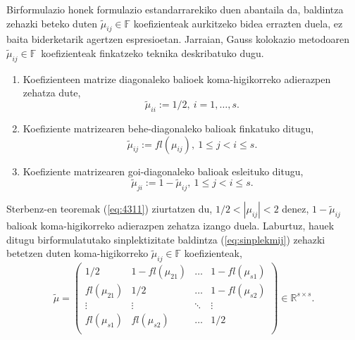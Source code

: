 Birformulazio honek formulazio estandarrarekiko duen abantaila da,  baldintza zehazki beteko duten $\tilde \mu_{ij} \in \mathbb{F}$ koefizienteak aurkitzeko bidea errazten duela, ez baita biderketarik agertzen espresioetan. Jarraian, Gauss kolokazio metodoaren $\tilde{\mu}_{ij} \in \mathbb{F}$~koefizienteak finkatzeko teknika deskribatuko dugu.  
\begin{enumerate}
\item Koefizienteen matrize diagonaleko balioek koma-higikorreko adierazpen zehatza dute,
\begin{equation*}
\tilde{\mu}_{ii}:=1/2, \ i=1,\dots,s.
\end{equation*}

\item Koefiziente matrizearen behe-diagonaleko balioak finkatuko ditugu,
\begin{equation*}
 \tilde{\mu}_{ij}:=fl(\mu_{ij}), \ 1 \leqslant j < i \leqslant s.
\end{equation*}

\item Koefiziente matrizearen goi-diagonaleko balioak esleituko ditugu,
\begin{equation*}
\tilde{\mu}_{ji}:=1-\tilde{\mu}_{ij} , \ 1 \leqslant j < i \leqslant s.
\end{equation*}

\end{enumerate}
Sterbenz-en teoremak (\ref{eq:4311}) ziurtatzen du, $1/2 < |\mu_{ij}| <2$ denez, $1-\tilde{\mu}_{ij}$ balioak koma-higikorreko adierazpen zehatza izango duela. Laburtuz, hauek ditugu birformulatutako sinplektizitate baldintza (\ref{eq:sinplekmij}) zehazki betetzen duten koma-higikorreko $\tilde{\mu}_{ij}\in \mathbb{F}$ koefizienteak,   
\begin{equation}
\tilde{\mu}=\left(\begin{array}{cccc}
    1/2       & 1-fl(\mu_{21}) & \dots & 1-fl(\mu_{s1})      \\
    fl(\mu_{21})      & 1/2    & \dots & 1-fl(\mu_{s2})      \\
    \vdots            & \vdots         & \ddots      & \vdots      \\
    fl(\mu_{s1})      & fl(\mu_{s2})   & \dots & 1/2          \\ 
     \end{array}\right) \in \mathbb{R}^{s \times s}.
\end{equation}

